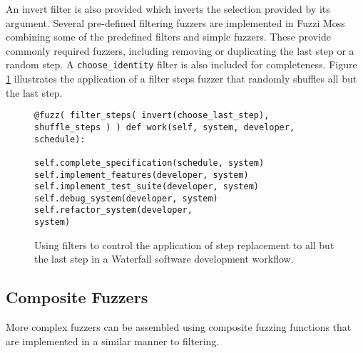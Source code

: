 \documentclass{sig-alternate}
\begin{document}
 An invert filter is also provided which inverts the selection provided by its argument. Several pre-defined filtering
 fuzzers are implemented in Fuzzi Moss combining some of the predefined filters and simple fuzzers.  These provide
 commonly required fuzzers, including removing or duplicating the last step or a random step. A
 \lstinline!choose_identity! filter is also included for completeness.  Figure \ref{fig:filter} illustrates the
 application of a filter steps fuzzer that randomly shuffles all but the last step.

\begin{figure}
  \centering

\begin{lstlisting}
@fuzz( filter_steps( invert(choose_last_step), shuffle_steps ) ) def work(self, system, developer, schedule):

self.complete_specification(schedule, system) self.implement_features(developer, system)
self.implement_test_suite(developer, system) self.debug_system(developer, system) self.refactor_system(developer,
system)

\end{lstlisting}

  \caption{Using filters to control the application of step replacement to all but the last step in a Waterfall software
    development workflow.}
  \label{fig:filter}
\end{figure}


\subsection{Composite Fuzzers}


More complex fuzzers can be assembled using composite fuzzing functions that are implemented in a similar manner to
filtering.
\end{document}
